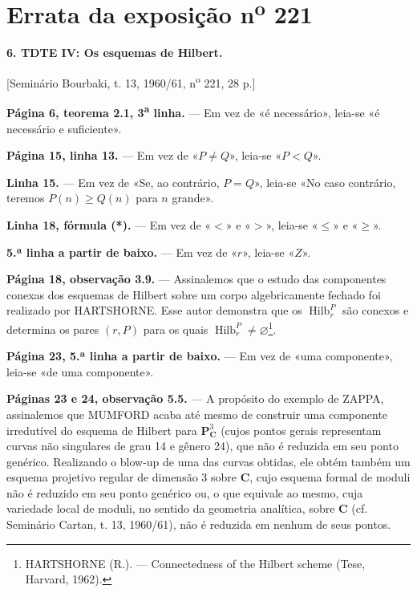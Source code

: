 \clearpage
\chapter*{Errata da exposição n\textsuperscript{o} 221}
\setcounter{footnote}{3}

\noindent\textbf{6. TDTE IV: Os esquemas de Hilbert.}

\begin{center}
[Seminário Bourbaki, t. 13, 1960/61, n\textsuperscript{o} 221, 28 p.]
\end{center}

\noindent\textbf{Página 6, teorema 2.1, 3\textsuperscript{a} linha.} --- Em vez de
«é necessário», leia-se «é necessário e suficiente».

\noindent\textbf{Página 15, linha 13.} --- Em vez de «$P\neq Q$», leia-se
«$P<Q$».

\noindent\textbf{Linha 15.} --- Em vez de «Se, ao contrário, $P=Q$», leia-se
«No caso contrário, teremos $P(n)\geq Q(n)$ para $n$ grande».

\noindent\textbf{Linha 18, fórmula (*).} --- Em vez de «$<$» e «$>$»,
leia-se «$\leq$» e «$\geq$».

\noindent\textbf{5.ª linha a partir de baixo.} --- Em vez de «$r$», leia-se
«$Z$».

\noindent\textbf{Página 18, observação 3.9.} --- Assinalemos que o estudo das
componentes conexas dos esquemas de Hilbert sobre um corpo algebricamente
fechado foi realizado por HARTSHORNE. Esse autor demonstra que os
$\operatorname{Hilb}^{P}_{r}$ são conexos e determina os pares $(r,P)$ para
os quais $\operatorname{Hilb}^{P}_{r}\neq\varnothing$\footnote{HARTSHORNE
(R.). --- Connectedness of the Hilbert scheme (Tese, Harvard, 1962).}.

\noindent\textbf{Página 23, 5.ª linha a partir de baixo.} --- Em vez de «uma
componente», leia-se «de uma componente».

\noindent\textbf{Páginas 23 e 24, observação 5.5.} --- A propósito do exemplo
de ZAPPA, assinalemos que MUMFORD acaba até mesmo de construir uma componente
irredutível do esquema de Hilbert para $\mathbf P^3_{\mathbf C}$ (cujos pontos
gerais representam curvas não singulares de grau 14 e gênero 24), que não é
reduzida em seu ponto genérico. Realizando o blow-up de uma das curvas obtidas,
ele obtém também um esquema projetivo regular de dimensão 3 sobre $\mathbf C$,
cujo esquema formal de moduli não é reduzido em seu ponto genérico ou, o que
equivale ao mesmo, cuja variedade local de moduli, no sentido da geometria
analítica, sobre $\mathbf C$ (cf. Seminário Cartan, t. 13, 1960/61), não é
reduzida em nenhum de seus pontos.

\par
